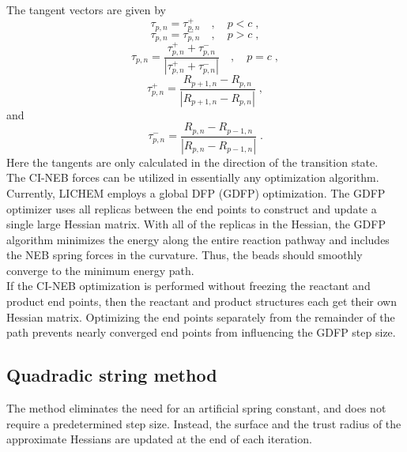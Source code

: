 \documentclass[12pt]{report}
\begin{document}
The tangent vectors are given
by \cite{NEB2000_A}
\begin{equation}
 \tau_{p,n} = \tau_{p,n}^{+}
 \quad , \quad
 p < c \; ,
\end{equation}
\begin{equation}
 \tau_{p,n} = \tau_{p,n}^{-}
 \quad , \quad
 p > c \; ,
\end{equation}
\begin{equation}
 \tau_{p,n} = \frac{\tau_{p,n}^{+}+\tau_{p,n}^{-}}
 {|\tau_{p,n}^{+}+\tau_{p,n}^{-}|}
 \quad , \quad
 p = c \; ,
\end{equation}
\begin{equation}
 \tau_{p,n}^{+} = \frac{R_{p+1,n}-R_{p,n}}{|R_{p+1,n}-R_{p,n}|} \; ,
\end{equation}
and
\begin{equation}
 \tau_{p,n}^{-} = \frac{R_{p,n}-R_{p-1,n}}{|R_{p,n}-R_{p-1,n}|} \; .
\end{equation}
Here the tangents are only calculated in the direction of the transition
state. \\

The CI-NEB forces can be utilized in essentially any optimization algorithm.
Currently, LICHEM employs a global DFP (GDFP) optimization.
The GDFP optimizer uses all replicas between the end points to construct and
update a single large Hessian matrix.
With all of the replicas in the Hessian, the GDFP algorithm minimizes the
energy along the entire reaction pathway and includes the NEB spring forces
in the curvature.
Thus, the beads should smoothly converge to the minimum energy path. \\

If the CI-NEB optimization is performed without freezing the reactant and
product end points, then the reactant and product structures each get their
own Hessian matrix.
Optimizing the end points separately from the remainder of the path prevents
nearly converged end points from influencing the GDFP step size.

\subsection{Quadradic string method}

The method eliminates the need for an artificial spring constant,
and does not require a predetermined step size.
Instead,  the surface and
the trust radius of the approximate Hessians are updated
at the end of each iteration. \\
\end{document}

